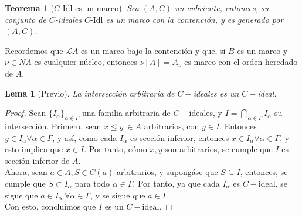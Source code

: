 \documentclass[12pt,letterpaper,titlepage]{article}
\newtheorem*{lemma}{Lema}
\newtheorem*{thm}{Teorema}
\theoremstyle{definition}
\newcommand\<{\langle}
\renewcommand\>{\rangle}
\newcommand\Idl{\text{-}\mathrm{Idl}}
\begin{document}
\begin{thm}[$C\Idl$ es un marco]
    Sea $(A,C)$ un cubriente, entonces, su conjunto de $C$-ideales $C\Idl$ es un marco con la contención, y es generado por $(A,C)$.
\end{thm}

Recordemos que $\mathcal{L}A$ es un marco bajo la contención
y que, si $B$ es un marco y $\nu\in NA$ es cualquier núcleo,
entonces $\nu[A]=A_\nu$ es marco con el orden heredado de $A$.

\begin{lemma}[Previo]
    La intersección arbitraria de $C-$ideales es un $C-$ideal.
\end{lemma}
\begin{proof}
    Sean $\{I_\alpha\}_{\alpha\in\Gamma}$ una familia arbitraria de $C-$ideales, y $I=\bigcap_{\alpha\in\Gamma}I_\alpha$ su intersección. Primero, sean $x\leq y\ \in A$ arbitrarios, con $y\in I$. Entonces $y\in I_\alpha\forall\alpha\in\Gamma$, y así, como cada $I_\alpha$ es sección inferior, entonces $x\in I_\alpha\forall\alpha\in\Gamma$, y esto implica que $x\in I$. Por tanto, cómo $x,y$ son arbitrarios, se cumple que $I$ es sección inferior de $A$.\\
    Ahora, sean $a\in A, S\in C(a)$ arbitrarios, y supongáse que $S\subseteq I$, entonces, se cumple que $S\subset I_\alpha$ para todo $\alpha\in\Gamma$. Por tanto, ya que cada $I_\alpha$ es $C-$ideal, se sigue que $a\in I_\alpha\ \forall\alpha\in\Gamma$, y se sigue que $a\in I$.\\
    Con esto, concluimos que $I$ es un $C-$ideal.
\end{proof}
\end{document}
